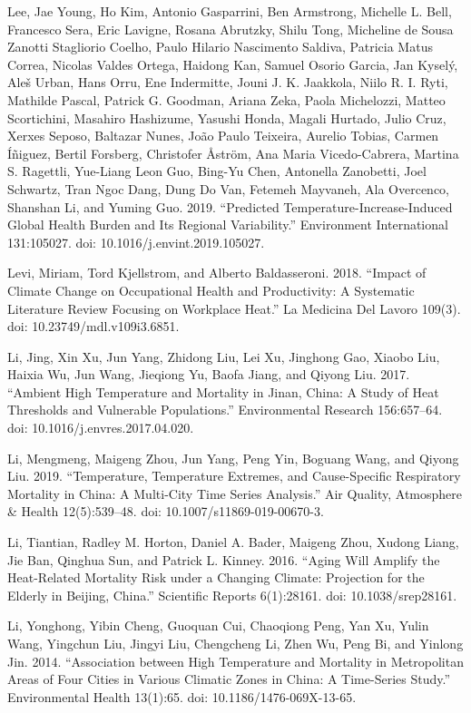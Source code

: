 \documentclass[12pt]{article}
\begin{document}
Lee, Jae Young, Ho Kim, Antonio Gasparrini, Ben Armstrong, Michelle L.
Bell, Francesco Sera, Eric Lavigne, Rosana Abrutzky, Shilu Tong,
Micheline de Sousa Zanotti Stagliorio Coelho, Paulo Hilario Nascimento
Saldiva, Patricia Matus Correa, Nicolas Valdes Ortega, Haidong Kan,
Samuel Osorio Garcia, Jan Kyselý, Aleš Urban, Hans Orru, Ene Indermitte,
Jouni J. K. Jaakkola, Niilo R. I. Ryti, Mathilde Pascal, Patrick G.
Goodman, Ariana Zeka, Paola Michelozzi, Matteo Scortichini, Masahiro
Hashizume, Yasushi Honda, Magali Hurtado, Julio Cruz, Xerxes Seposo,
Baltazar Nunes, João Paulo Teixeira, Aurelio Tobias, Carmen Íñiguez,
Bertil Forsberg, Christofer Åström, Ana Maria Vicedo-Cabrera, Martina S.
Ragettli, Yue-Liang Leon Guo, Bing-Yu Chen, Antonella Zanobetti, Joel
Schwartz, Tran Ngoc Dang, Dung Do Van, Fetemeh Mayvaneh, Ala Overcenco,
Shanshan Li, and Yuming Guo. 2019. ``Predicted
Temperature-Increase-Induced Global Health Burden and Its Regional
Variability.'' Environment International 131:105027. doi:
10.1016/j.envint.2019.105027.

Levi, Miriam, Tord Kjellstrom, and Alberto Baldasseroni. 2018. ``Impact
of Climate Change on Occupational Health and Productivity: A Systematic
Literature Review Focusing on Workplace Heat.'' La Medicina Del Lavoro
109(3). doi: 10.23749/mdl.v109i3.6851.

Li, Jing, Xin Xu, Jun Yang, Zhidong Liu, Lei Xu, Jinghong Gao, Xiaobo
Liu, Haixia Wu, Jun Wang, Jieqiong Yu, Baofa Jiang, and Qiyong Liu.
2017. ``Ambient High Temperature and Mortality in Jinan, China: A Study
of Heat Thresholds and Vulnerable Populations.'' Environmental Research
156:657--64. doi: 10.1016/j.envres.2017.04.020.

Li, Mengmeng, Maigeng Zhou, Jun Yang, Peng Yin, Boguang Wang, and Qiyong
Liu. 2019. ``Temperature, Temperature Extremes, and Cause-Specific
Respiratory Mortality in China: A Multi-City Time Series Analysis.'' Air
Quality, Atmosphere \& Health 12(5):539--48. doi:
10.1007/s11869-019-00670-3.

Li, Tiantian, Radley M. Horton, Daniel A. Bader, Maigeng Zhou, Xudong
Liang, Jie Ban, Qinghua Sun, and Patrick L. Kinney. 2016. ``Aging Will
Amplify the Heat-Related Mortality Risk under a Changing Climate:
Projection for the Elderly in Beijing, China.'' Scientific Reports
6(1):28161. doi: 10.1038/srep28161.

Li, Yonghong, Yibin Cheng, Guoquan Cui, Chaoqiong Peng, Yan Xu, Yulin
Wang, Yingchun Liu, Jingyi Liu, Chengcheng Li, Zhen Wu, Peng Bi, and
Yinlong Jin. 2014. ``Association between High Temperature and Mortality
in Metropolitan Areas of Four Cities in Various Climatic Zones in China:
A Time-Series Study.'' Environmental Health 13(1):65. doi:
10.1186/1476-069X-13-65.
\end{document}
